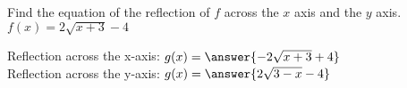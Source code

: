 \documentclass{ximera}
\author{David Kish}
\begin{document}
\begin{exercise}

Find the equation of the reflection of $f$ across the $x$ axis and the $y$ axis.\\

$f(x)=2\sqrt{x+3}-4$

Reflection across the x-axis: $g(x)=\answer{-2\sqrt{x+3}+4}$\\
Reflection across the y-axis: $g(x)=\answer{2\sqrt{3-x}-4}$\\




\end{exercise}
\end{document}
